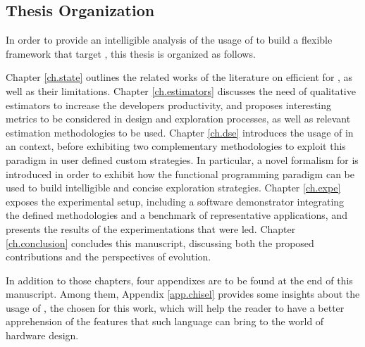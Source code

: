     \subsection{Thesis Organization}
    \label{ch.problem:sec.synthesis:ssec.organization}
        In order to provide an intelligible analysis of the usage of  to build a flexible  framework that target , this thesis is organized as follows.

        Chapter \ref{ch.state} outlines the related works of the literature on efficient  for , as well as their limitations.
        Chapter \ref{ch.estimators} discusses the need of qualitative estimators to increase the developers productivity, and proposes interesting metrics to be considered in design and exploration processes, as well as relevant estimation methodologies to be used.
        Chapter \ref{ch.dse} introduces the usage of  in an  context, before exhibiting two complementary methodologies to exploit this paradigm in user defined custom strategies.
        In particular, a novel formalism for  is introduced in order to exhibit how the functional programming paradigm can be used to build intelligible and concise exploration strategies.
        Chapter \ref{ch.expe} exposes the experimental setup, including a software demonstrator integrating the defined methodologies and a benchmark of representative applications, and presents the results of the experimentations that were led.
        Chapter \ref{ch.conclusion} concludes this manuscript, discussing both the proposed contributions and the perspectives of evolution.

        In addition to those chapters, four appendixes are to be found at the end of this manuscript.
        Among them, Appendix \ref{app.chisel} provides some insights about the usage of \chisel, the chosen  for this work, which will help the reader to have a better apprehension of the features that such language can bring to the world of hardware design.


